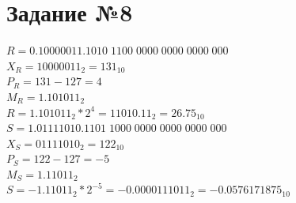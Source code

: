 \documentclass[12pt,a4paper]{report}
\begin{document}
\section*{Задание №8}
$R=0.10000011.1010\;1100\;0000\;0000\;0000\;000$\\
$X_R=10000011_2=131_{10}$\\
$P_R=131-127=4$\\
$M_R=1.101011_2$\\
$R=1.101011_2 * 2^4=11010.11_2=26.75_{10}$\\
\hfill\break
$S=1.01111010.1101\;1000\;0000\;0000\;0000\;000$\\
$X_S=01111010_2=122_{10}$\\
$P_S=122-127=-5$\\
$M_S=1.11011_2$\\
$S=-1.11011_2 * 2^{-5}=-0.0000111011_2=-0.0576171875_{10}$
\end{document}
